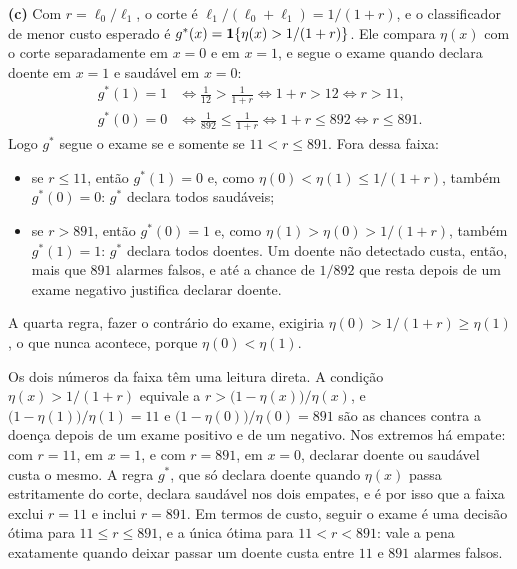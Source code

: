 \begin{solucao}
\smallskip
\textbf{(c)} Com $r=\ell_0/\ell_1$, o corte é $\ell_1/(\ell_0+\ell_1)=1/(1+r)$, e o
classificador de menor custo esperado é $g^*(x)=\mathbf{1}\!\left\{\eta(x)>1/(1+r)\right\}$. Ele compara $\eta(x)$
com o corte separadamente em $x=0$ e em $x=1$, e segue o exame quando declara doente em $x=1$
e saudável em $x=0$:
\begin{align*}
  g^*(1)=1&\iff\frac1{12}>\frac1{1+r}\iff 1+r>12\iff r>11,\\
  g^*(0)=0&\iff\frac1{892}\le\frac1{1+r}\iff 1+r\le892\iff r\le891 .
\end{align*}
Logo $g^*$ segue o exame se e somente se $11<r\le891$. Fora dessa faixa:
\begin{itemize}[leftmargin=1.2cm]
  \item se $r\le11$, então $g^*(1)=0$ e, como $\eta(0)<\eta(1)\le1/(1+r)$, também $g^*(0)=0$:
        $g^*$ declara todos saudáveis;
  \item se $r>891$, então $g^*(0)=1$ e, como $\eta(1)>\eta(0)>1/(1+r)$, também $g^*(1)=1$:
        $g^*$ declara todos doentes. Um doente não detectado custa, então, mais que $891$
        alarmes falsos, e até a chance de $1/892$ que resta depois de um exame negativo
        justifica declarar doente.
\end{itemize}
A quarta regra, fazer o contrário do exame, exigiria $\eta(0)>1/(1+r)\ge\eta(1)$, o que nunca
acontece, porque $\eta(0)<\eta(1)$.

Os dois números da faixa têm uma leitura direta. A condição $\eta(x)>1/(1+r)$ equivale a
$r>\big(1-\eta(x)\big)/\eta(x)$, e $\big(1-\eta(1)\big)/\eta(1)=11$ e
$\big(1-\eta(0)\big)/\eta(0)=891$ são as chances contra a doença depois de um exame positivo e
de um negativo. Nos extremos há empate: com $r=11$, em $x=1$, e com $r=891$, em $x=0$, declarar
doente ou saudável custa o mesmo. A regra $g^*$, que só declara doente quando $\eta(x)$ passa
estritamente do corte, declara saudável nos dois empates, e é por isso que a faixa exclui
$r=11$ e inclui $r=891$. Em termos de custo, seguir o exame é uma decisão ótima para
$11\le r\le891$, e a única ótima para $11<r<891$: vale a pena exatamente quando deixar passar
um doente custa entre $11$ e $891$ alarmes falsos.


\end{solucao}
